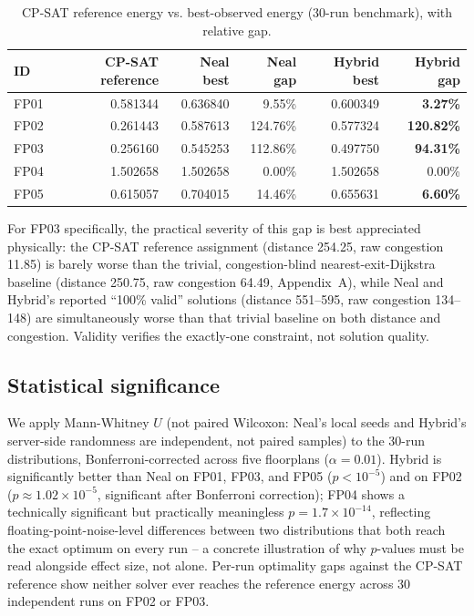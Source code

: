 \documentclass[11pt]{article}
\begin{document}
\begin{table}[h]
\centering
\caption{CP-SAT reference energy vs. best-observed energy (30-run benchmark), with relative gap.}
\label{tab:milpgaps}
\small
\begin{tabular}{lrrrrr}
\toprule
ID & CP-SAT reference & Neal best & Neal gap & Hybrid best & Hybrid gap \\
\midrule
FP01 & 0.581344 & 0.636840 & 9.55\% & 0.600349 & \textbf{3.27\%} \\
FP02 & 0.261443 & 0.587613 & 124.76\% & 0.577324 & \textbf{120.82\%} \\
FP03 & 0.256160 & 0.545253 & 112.86\% & 0.497750 & \textbf{94.31\%} \\
FP04 & 1.502658 & 1.502658 & 0.00\% & 1.502658 & 0.00\% \\
FP05 & 0.615057 & 0.704015 & 14.46\% & 0.655631 & \textbf{6.60\%} \\
\bottomrule
\end{tabular}
\end{table}

For FP03 specifically, the practical severity of this gap is best appreciated physically: the CP-SAT reference assignment (distance 254.25, raw congestion 11.85) is barely worse than the trivial, congestion-blind nearest-exit-Dijkstra baseline (distance 250.75, raw congestion 64.49, Appendix~A), while Neal and Hybrid's reported ``100\% valid'' solutions (distance 551--595, raw congestion 134--148) are simultaneously worse than that trivial baseline on both distance and congestion. Validity verifies the exactly-one constraint, not solution quality.

\subsection{Statistical significance}
\label{sec:significance}
We apply Mann-Whitney $U$ (not paired Wilcoxon: Neal's local seeds and Hybrid's server-side randomness are independent, not paired samples) to the 30-run distributions, Bonferroni-corrected across five floorplans ($\alpha=0.01$). Hybrid is significantly better than Neal on FP01, FP03, and FP05 ($p<10^{-5}$) and on FP02 ($p\approx1.02\times10^{-5}$, significant after Bonferroni correction); FP04 shows a technically significant but practically meaningless $p=1.7\times10^{-14}$, reflecting floating-point-noise-level differences between two distributions that both reach the exact optimum on every run -- a concrete illustration of why $p$-values must be read alongside effect size, not alone. Per-run optimality gaps against the CP-SAT reference show neither solver ever reaches the reference energy across 30 independent runs on FP02 or FP03.
\end{document}
